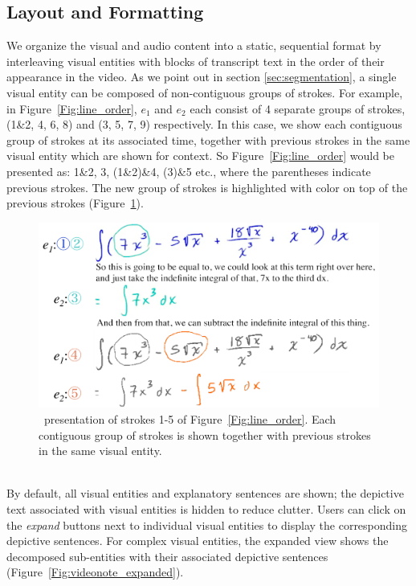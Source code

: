 \subsection{Layout and Formatting}
\label{sec:layout}
We organize the visual and audio content into a static, sequential format by interleaving visual entities with blocks of transcript text in the order of their appearance in the video. As we point out in section \ref{sec:segmentation}, a single visual entity can be composed of non-contiguous groups of strokes. For example, in Figure~\ref{Fig:line_order}, $e_1$ and $e_2$ each consist of 4 separate groups of strokes, (1\&2, 4, 6, 8) and (3, 5, 7, 9) respectively. In this case, we show each contiguous group of strokes at its associated time, together with previous strokes in the same visual entity which are shown for context. So Figure~\ref{Fig:line_order} would be presented as: 1\&2, 3, (1\&2)\&4, (3)\&5 etc., where the parentheses indicate previous strokes. The new group of strokes is highlighted with color on top of the previous strokes (Figure~\ref{Fig:layout_line_order}). 
\begin{figure}[h!]
        \centering
        \includegraphics[width=\textwidth]{figures/layout_line_order.pdf}
        \captionsetup{font=footnotesize}
        \caption{\systemname\ presentation of strokes 1-5 of Figure~\ref{Fig:line_order}. Each contiguous group of strokes is shown together with previous strokes in the same visual entity.}
        \label{Fig:layout_line_order}
\end{figure}\\

By default, all visual entities and explanatory sentences are shown; the depictive text associated with visual entities is hidden to reduce clutter. Users can click on the \emph{expand} buttons next to individual visual entities to display the corresponding depictive sentences. For complex visual entities, the expanded view shows the decomposed sub-entities with their associated depictive sentences (Figure~\ref{Fig:videonote_expanded}).\\

